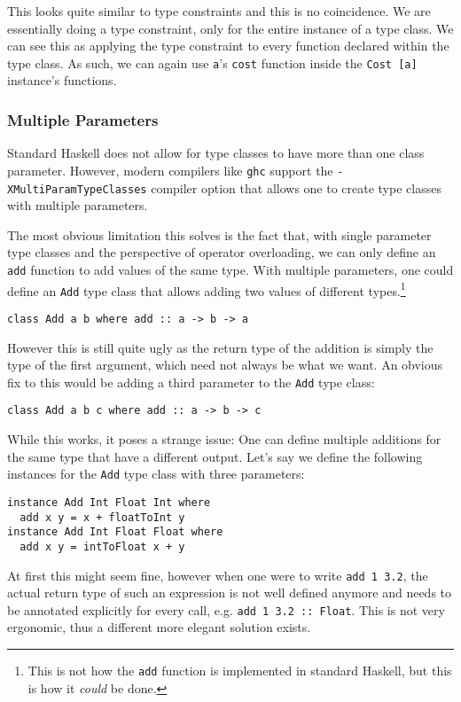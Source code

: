 This looks quite similar to type constraints and this is no coincidence. We are essentially doing a type constraint, only for the entire instance of a type class. We can see this as applying the type constraint to every function declared within the type class. As such, we can again use \verb|a|'s \verb|cost| function inside the \verb|Cost [a]| instance's functions.



\subsubsection{Multiple Parameters}\label{haskell-add}

Standard Haskell does not allow for type classes to have more than one class parameter. However, modern compilers like \verb|ghc| support the \verb|-XMultiParamTypeClasses| compiler option that allows one to create type classes with multiple parameters.

The most obvious limitation this solves is the fact that, with single parameter type classes and the perspective of operator overloading, we can only define an \verb|add| function to add values of the same type. With multiple parameters, one could define an \verb|Add| type class that allows adding two values of different types.\footnote{This is not how the \verb|add| function is implemented in standard Haskell, but this is how it \textit{could} be done.}
\begin{verbatim}
class Add a b where add :: a -> b -> a
\end{verbatim}
However this is still quite ugly as the return type of the addition is simply the type of the first argument, which need not always be what we want. An obvious fix to this would be adding a third parameter to the \verb|Add| type class:
\begin{verbatim}
class Add a b c where add :: a -> b -> c
\end{verbatim}
While this works, it poses a strange issue: One can define multiple additions for the same type that have a different output. Let's say we define the following instances for the \verb|Add| type class with three parameters:
\begin{verbatim}
instance Add Int Float Int where
  add x y = x + floatToInt y
instance Add Int Float Float where
  add x y = intToFloat x + y
\end{verbatim}
At first this might seem fine, however when one were to write \verb|add 1 3.2|, the actual return type of such an expression is not well defined anymore and needs to be annotated explicitly for every call, e.g. \verb|add 1 3.2 :: Float|. This is not very ergonomic, thus a different more elegant solution exists.

